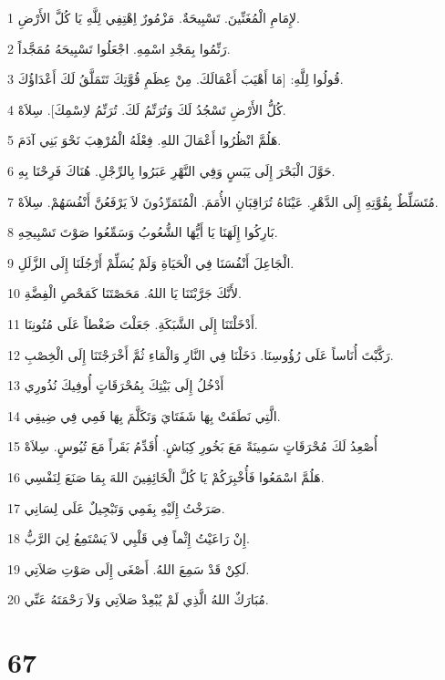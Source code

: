 \par 1 لإِمَامِ الْمُغَنِّينَ. تَسْبِيحَةٌ. مَزْمُورٌ اِهْتِفِي لِلَّهِ يَا كُلَّ الأَرْضِ.
\par 2 رَنِّمُوا بِمَجْدِ اسْمِهِ. اجْعَلُوا تَسْبِيحَهُ مُمَجَّداً.
\par 3 قُولُوا لِلَّهِ: [مَا أَهْيَبَ أَعْمَالَكَ. مِنْ عِظَمِ قُوَّتِكَ تَتَمَلَّقُ لَكَ أَعْدَاؤُكَ.
\par 4 كُلُّ الأَرْضِ تَسْجُدُ لَكَ وَتُرَنِّمُ لَكَ. تُرَنِّمُ لاِسْمِكَ]. سِلاَهْ.
\par 5 هَلُمَّ انْظُرُوا أَعْمَالَ اللهِ. فِعْلَهُ الْمُرْهِبَ نَحْوَ بَنِي آدَمَ.
\par 6 حَوَّلَ الْبَحْرَ إِلَى يَبَسٍ وَفِي النَّهْرِ عَبَرُوا بِالرِّجْلِ. هُنَاكَ فَرِحْنَا بِهِ.
\par 7 مُتَسَلِّطٌ بِقُوَّتِهِ إِلَى الدَّهْرِ. عَيْنَاهُ تُرَاقِبَانِ الأُمَمَ. الْمُتَمَرِّدُونَ لاَ يَرْفَعُنَّ أَنْفُسَهُمْ. سِلاَهْ.
\par 8 بَارِكُوا إِلَهَنَا يَا أَيُّهَا الشُّعُوبُ وَسَمِّعُوا صَوْتَ تَسْبِيحِهِ.
\par 9 الْجَاعِلَ أَنْفُسَنَا فِي الْحَيَاةِ وَلَمْ يُسَلِّمْ أَرْجُلَنَا إِلَى الزَّلَلِ.
\par 10 لأَنَّكَ جَرَّبْتَنَا يَا اللهُ. مَحَصْتَنَا كَمَحْصِ الْفِضَّةِ.
\par 11 أَدْخَلْتَنَا إِلَى الشَّبَكَةِ. جَعَلْتَ ضَغْطاً عَلَى مُتُونِنَا.
\par 12 رَكَّبْتَ أُنَاساً عَلَى رُؤُوسِنَا. دَخَلْنَا فِي النَّارِ وَالْمَاءِ ثُمَّ أَخْرَجْتَنَا إِلَى الْخِصْبِ.
\par 13 أَدْخُلُ إِلَى بَيْتِكَ بِمُحْرَقَاتٍ أُوفِيكَ نُذُورِي
\par 14 الَّتِي نَطَقَتْ بِهَا شَفَتَايَ وَتَكَلَّمَ بِهَا فَمِي فِي ضِيقِي.
\par 15 أُصْعِدُ لَكَ مُحْرَقَاتٍ سَمِينَةً مَعَ بَخُورِ كِبَاشٍ. أُقَدِّمُ بَقَراً مَعَ تُيُوسٍ. سِلاَهْ
\par 16 هَلُمَّ اسْمَعُوا فَأُخْبِرَكُمْ يَا كُلَّ الْخَائِفِينَ اللهَ بِمَا صَنَعَ لِنَفْسِي.
\par 17 صَرَخْتُ إِلَيْهِ بِفَمِي وَتَبْجِيلٌ عَلَى لِسَانِي.
\par 18 إِنْ رَاعَيْتُ إِثْماً فِي قَلْبِي لاَ يَسْتَمِعُ لِيَ الرَّبُّ.
\par 19 لَكِنْ قَدْ سَمِعَ اللهُ. أَصْغَى إِلَى صَوْتِ صَلاَتِي.
\par 20 مُبَارَكٌ اللهُ الَّذِي لَمْ يُبْعِدْ صَلاَتِي وَلاَ رَحْمَتَهُ عَنِّي.

\chapter{67}

